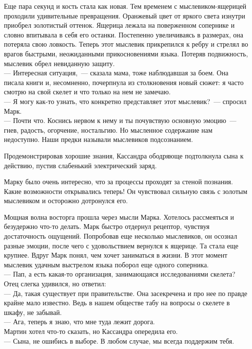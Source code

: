 Еще пара секунд и кость стала как новая. Тем временем с мыслевиком-ящерицей 
проходили удивительные превращения. Оранжевый цвет от яркого света изнутри 
приобрел золотистый оттенок. Ящерица лежала на поверженном сопернике и словно 
впитывала в себя его останки. Постепенно увеличиваясь в размерах, она потеряла 
свою ловкость. Теперь этот мыслевик прикрепился к ребру и стрелял во врагов 
быстрыми, неожиданными прикосновениями языка. Потеряв подвижность, мыслевик 
обрел невиданную защиту.\\
--- Интересная ситуация,~--- сказала мама, тоже наблюдавшая за боем. Она писала 
книги и, несомненно, почерпнула из столкновения новый сюжет: я часто смотрю на 
свой скелет и что только на нем не замечаю.\\
--- Я могу как-то узнать, что конкретно представляет этот мыслевик?~--- спросил 
Марк.\\
--- Почти что. Коснись нервом к нему и ты почувствую основную эмоцию~--- гнев, 
радость, огорчение, ностальгию. Но мысленное содержание нам недоступно. Наши 
предки называли мыслевиков подсознанием.

Продемонстрировав хорошие знания, Кассандра ободряюще подтолкнула сына к 
действию, пустив слабенький электрический заряд.

Марку было очень интересно, что за процессы проходят за стеной познания. Какие 
возможности открывались теперь! Он чувствовал сильную связь с золотым 
мыслевиком и осторожно дотронулся его.

Мощная волна восторга прошла через мысли Марка. Хотелось рассмеяться и 
безудержно что-то делать. Марк быстро отдернул рецептор, чувствуя достаточность 
ощущений. Попробовав еще несколько мыслевиков, он осознал разные эмоции, после 
чего с удовольствием вернулся к ящерице. Та стала еще крупнее. Вдруг Марк 
понял, чем хочет заниматься в жизни. В этот момент мыслевик удачным выстрелом 
языка поборол еще одного соперника.\\
--- Пап, а есть какая-то организация, занимающаяся исследованиями скелета?\\
Отец слегка удивился, но ответил: \\
--- Да, такая существует при правительстве. Она 
засекречена и про нее по правде крайне мало известно. Ведь в нашем обществе 
табу на вопросы о скелете в шкафу, не забывай.\\
--- Ага, теперь я знаю, что мне туда лежит дорога.\\
Мартин хотел что-то сказать, но Кассандра опередила его.\\
--- Сына, не ошибись в выборе. В любом случае, мы всегда поддержим тебя.

